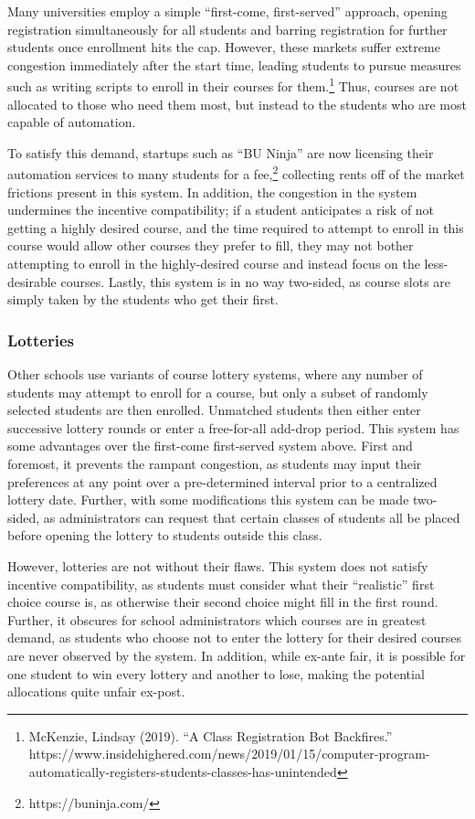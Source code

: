 \documentclass{article}
\begin{document}
Many universities employ a simple ``first-come, first-served'' approach, opening registration simultaneously for all students and barring registration for further students once enrollment hits the cap. However, these markets suffer extreme congestion immediately after the start time, leading students to pursue measures such as writing scripts to enroll in their courses for them.\footnote{McKenzie, Lindsay (2019). ``A Class Registration Bot Backfires.''  https://www.insidehighered.com/news/2019/01/15/computer-program-automatically-registers-students-classes-has-unintended} Thus, courses are not allocated to those who need them most, but instead to the students who are most capable of automation. 

To satisfy this demand, startups such as ``BU Ninja'' are now licensing their automation services to many students for a fee,\footnote{https://buninja.com/} collecting rents off of the market frictions present in this system. In addition, the congestion in the system undermines the incentive compatibility; if a student anticipates a risk of not getting a highly desired course, and the time required to attempt to enroll in this course would allow other courses they prefer to fill, they may not bother attempting to enroll in the highly-desired course and instead focus on the less-desirable courses. Lastly, this system is in no way two-sided, as course slots are simply taken by the students who get their first. 

\subsubsection{Lotteries}

Other schools use variants of course lottery systems, where any number of students may attempt to enroll for a course, but only a subset of randomly selected students are then enrolled. Unmatched students then either enter successive lottery rounds or enter a free-for-all add-drop period. This system has some advantages over the first-come first-served system above. First and foremost, it prevents the rampant congestion, as students may input their preferences at any point over a pre-determined interval prior to a centralized lottery date. Further, with some modifications this system can be made two-sided, as administrators can request that certain classes of students all be placed before opening the lottery to students outside this class.

However, lotteries are not without their flaws. This system does not satisfy incentive compatibility, as students must consider what their ``realistic'' first choice course is, as otherwise their second choice might fill in the first round. Further, it obscures for school administrators which courses are in greatest demand, as students who choose not to enter the lottery for their desired courses are never observed by the system. In addition, while ex-ante fair, it is possible for one student to win every lottery and another to lose, making the potential allocations quite unfair ex-post. 
\end{document}
